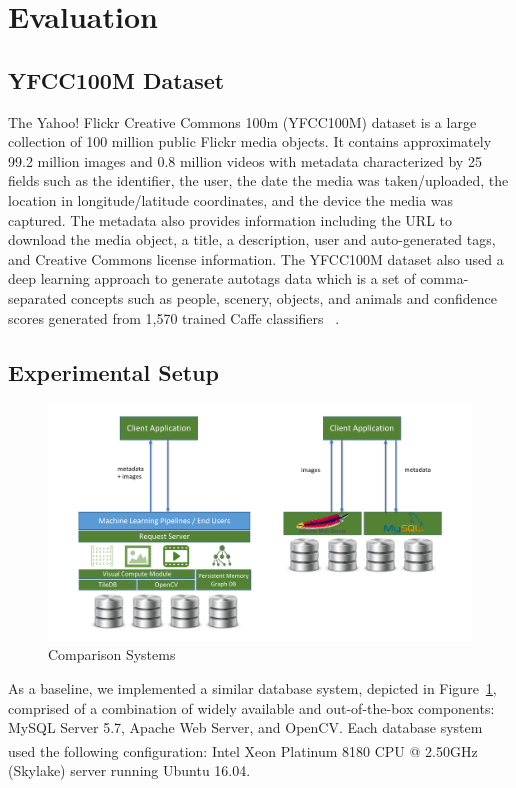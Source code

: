 \section{Evaluation}
\label{eval}

\subsection{YFCC100M Dataset}
\label{dataset}

The Yahoo! Flickr Creative Commons 100m (YFCC100M) dataset is a large collection of 100 million public Flickr media objects.  It contains approximately 99.2 million images and 0.8 million videos with metadata characterized by 25 fields such as the identifier, the user, the date the media was taken/uploaded, the location in longitude/latitude coordinates, and the device the media was captured.  The metadata also provides information including the URL to download the media object, a title, a description, user and auto-generated tags, and Creative Commons license information.  The YFCC100M dataset also used a deep learning approach to generate autotags data which is a set of comma-separated concepts such as people, scenery, objects, and animals and confidence scores generated from 1,570 trained Caffe classifiers ~\cite{Thomee_2016}. 

\subsection{Experimental Setup}

\begin{figure}[]
\centering
\includegraphics[width=\textwidth]{figures/comparison_system}
\caption{Comparison Systems}
\label{fig:systems}
\end{figure}

As a baseline, we implemented a similar database system, depicted in Figure~\ref{fig:systems}, comprised of a combination of widely available and out-of-the-box components: MySQL Server 5.7, Apache Web Server, and OpenCV.  Each database system used the following configuration: Intel\textsuperscript{\textregistered} Xeon\textsuperscript{\textregistered} Platinum 8180 CPU @ 2.50GHz (Skylake) server running Ubuntu 16.04.  


